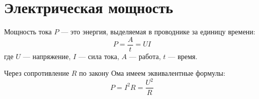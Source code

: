 \documentclass{article}
\begin{document}
\section*{Электрическая мощность}

Мощность тока $P$ — это энергия, выделяемая в проводнике за единицу времени:
\[
P = \frac{A}{t} = UI
\]
где $U$ — напряжение, $I$ — сила тока, $A$ — работа, $t$ — время.

Через сопротивление $R$ по закону Ома имеем эквивалентные формулы:
\[
P = I^2R = \frac{U^2}{R}
\]
\end{document}
